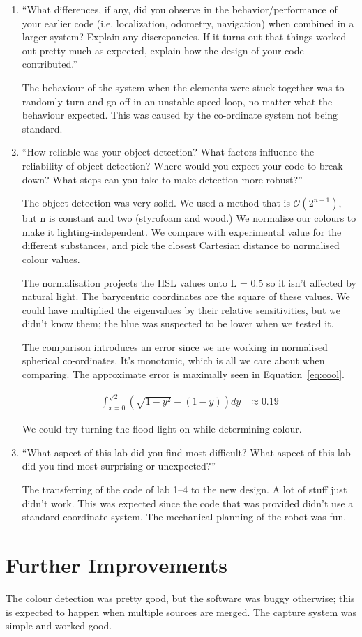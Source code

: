 \documentclass[twocolumn]{article}
\begin{document}
\begin{enumerate}

\item ``What differences, if any, did you observe in the behavior/performance of your earlier code (i.e. localization, odometry, navigation) when combined in a larger system? Explain any discrepancies. If it turns out that things worked out pretty much as expected, explain how the design of your code contributed.''

The behaviour of the system when the elements were stuck together was to randomly turn and go off in an unstable speed loop, no matter what the behaviour expected. This was caused by the co-ordinate system not being standard.

\item ``How reliable was your object detection? What factors influence the reliability of object detection? Where would you expect your code to break down? What steps can you take to make detection more robust?''

The object detection was very solid. We used a method that is $\mathcal{O}(2^{n-1})$, but n is constant and two (styrofoam and wood.) We normalise our colours to make it lighting-independent. We compare with experimental value for the different substances, and pick the closest Cartesian distance to normalised colour values.

The normalisation projects the HSL values onto L = 0.5 so it isn't affected by natural light. The barycentric coordinates are the square of these values. We could have multiplied the eigenvalues by their relative sensitivities, but we didn't know them; the blue was suspected to be lower when we tested it.

The comparison introduces an error since we are working in normalised spherical co-ordinates. It's monotonic, which is all we care about when comparing. The approximate error is maximally seen in Equation~\ref{eq:cool}.

\begin{align}
\int_{x=0}^{\sqrt{2}} \left(
	\sqrt{1-y^{2}} - (1 - y)
\right) dy &\approx 0.19
\label{eq:cool}
\end{align}

We could try turning the flood light on while determining colour.

\item ``What aspect of this lab did you find most difficult? What aspect of this lab did you find most surprising or unexpected?''

The transferring of the code of lab 1--4\cite{alexneil1,alexneil2,alexneil3,alexneil4} to the new design. A lot of stuff just didn't work. This was expected since the code that was provided didn't use a standard coordinate system\cite{iso}. The mechanical planning of the robot was fun.

\end{enumerate}

\section{Further Improvements}

The colour detection was pretty good, but the software was buggy otherwise; this is expected to happen when multiple sources are merged. The capture system was simple and worked good.


\end{document}
